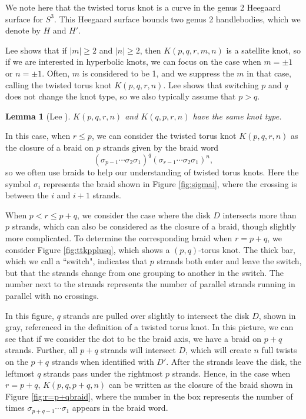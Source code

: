 \documentclass{amsart}
\newtheorem{lemma}{Lemma}
\begin{document}
We note here that the twisted torus knot is a curve in the genus 2 Heegaard surface for $S^3$. This Heegaard surface bounds two genus 2 handlebodies, which we denote by $H$ and $H'$.

Lee \cite{LeeTTKTypes} shows that if $|m| \ge 2$ and $|n| \ge 2$, then $K(p,q,r,m,n)$ is a satellite knot, so if we are interested in hyperbolic knots, we can focus on the case when $m = \pm 1$ or $n = \pm 1$. Often, $m$ is considered to be 1, and we suppress the $m$ in that case, calling the twisted torus knot $K(p,q,r,n)$. Lee \cite{LeeTTKTypes} shows that switching $p$ and $q$ does not change the knot type, so we also typically assume that $p >q$.
\begin{lemma}[Lee \cite{LeeTTKTypes}]\label{lem:lee}
$K(p,q,r,n)$ and $K(q,p,r,n)$ have the same knot type.
\end{lemma}

In this case, when $r \le p$, we can consider the twisted torus knot $K(p,q,r,n)$ as the closure of a braid on $p$ strands given by the braid word $$(\sigma_{p-1} \cdots \sigma_2 \sigma_1)^q (\sigma_{r-1} \cdots \sigma_2 \sigma_1)^n,$$
so we often use braids to help our understanding of twisted torus knots. Here the symbol $\sigma_i$ represents the braid shown in Figure \ref{fig:sigmai}, where the crossing is between the $i$ and $i+1$ strands.

When $p < r \le p+q$, we consider the case where the disk $D$ intersects more than $p$ strands, which can also be considered as the closure of a braid, though slightly more complicated. To determine the corresponding braid when $r = p+q$, we consider Figure \ref{fig:ttkpplusq}, which shows a $(p,q)$-torus knot. The thick bar, which we call a ``switch", indicates that $p$ strands both enter and leave the switch, but that the strands change from one grouping to another in the switch. The number next to the strands represents the number of parallel strands running in parallel with no crossings.

In this figure, $q$ strands are pulled over slightly to intersect the disk $D$, shown in gray, referenced in the definition of a twisted torus knot. In this picture, we can see that if we consider the dot to be the braid axis, we have a braid on $p+q$ strands. Further, all $p+q$ strands will intersect $D$, which will create $n$ full twists on the $p+q$ strands when identified with $D'$. After the strands leave the disk, the leftmost $q$ strands pass under the rightmost $p$ strands. Hence, in the case when $r = p+q$, $K(p,q,p+q, n)$ can be written as the closure of the braid 
shown in Figure \ref{fig:r=p+qbraid}, where the number in the box represents the number of times $\sigma_{p+q - 1} \cdots \sigma_1$ appears in the braid word.
\end{document}
